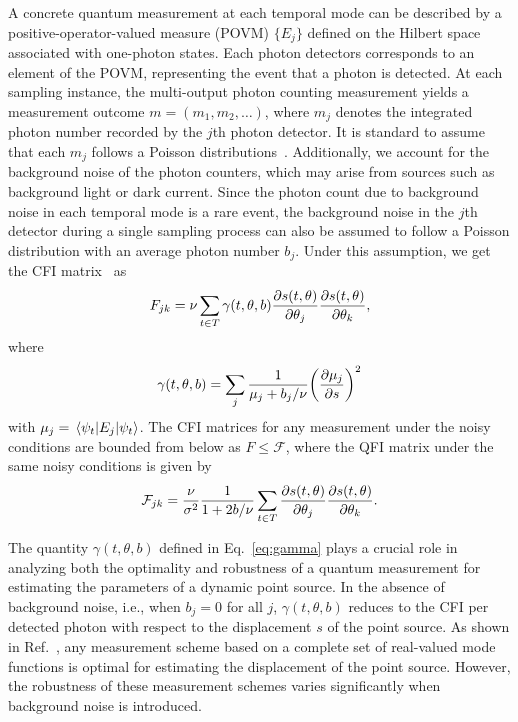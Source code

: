 \documentclass[aps,pra,10pt,showpacs,amsmath,amssymb,floatfix,superscriptaddress,twocolumn]{revtex4-2}
\begin{document}
A concrete quantum measurement at each temporal mode can be described by a positive-operator-valued measure (POVM) \( \{E_j\} \) defined on the Hilbert space associated with one-photon states.
Each photon detectors corresponds to an element of the POVM, representing the event that a photon is detected.
At each sampling instance, the multi-output photon counting measurement yields a measurement outcome \(m=(m_1, m_2, \ldots)\), where \(m_j\) denotes the integrated photon number recorded by the \(j\)th photon detector.
It is standard to assume that each \(m_j\) follows a Poisson distributions~\cite{Tsang2021, Smith2010, Starr2012}.
Additionally, we account for the background noise of the photon counters, which may arise from sources such as background light or dark current.
Since the photon count due to background noise in each temporal mode is a rare event, the background noise in the \( j \)th detector during a single sampling process can also be assumed to follow a Poisson distribution with an average photon number \(b_j\).
Under this assumption, we get the CFI matrix~\cite{SupplementalMaterial} as
\begin{equation}\label{eq:CFI}
  F_{jk}
  = \nu \sum_{t \in T} \gamma(t,\theta,b) \pdv{s(t,\theta)}{\theta_j} \pdv{s(t,\theta)}{\theta_k},
\end{equation}
where
\begin{equation} \label{eq:gamma}
    \gamma(t, \theta, b) = \sum_j \frac1{\mu_j + b_j / \nu} \qty(\pdv{\mu_j}{s})^2
\end{equation}  
with \( \mu_j = \ev{E_j}{\psi_t} \).
The CFI matrices for any measurement under the noisy conditions are bounded from below as \(F \leq \mathcal F\), where the QFI matrix under the same noisy conditions is given by~\cite{SupplementalMaterial}
\begin{equation} \label{eq:noisy_qfi}
    \mathcal{F}_{jk} = \frac{\nu}{\sigma^2}\frac{1}{1+2b/\nu}\sum_{t\in T} \pdv{s(t,\theta)}{\theta_j} \pdv{s(t,\theta)}{\theta_k}.
\end{equation}


The quantity \( \gamma(t,\theta,b) \) defined in Eq.~\eqref{eq:gamma} plays a crucial role in analyzing both the optimality and robustness of a quantum measurement for estimating the parameters of a dynamic point source.
In the absence of background noise, i.e., when \( b_j = 0 \) for all \( j \), \( \gamma(t,\theta,b) \) reduces to the CFI per detected photon with respect to the displacement \( s \) of the point source.
As shown in Ref.~\cite{Zhou2023}, any measurement scheme based on a complete set of real-valued mode functions is optimal for estimating the displacement of the point source.
However, the robustness of these measurement schemes varies significantly when background noise is introduced.
\end{document}
